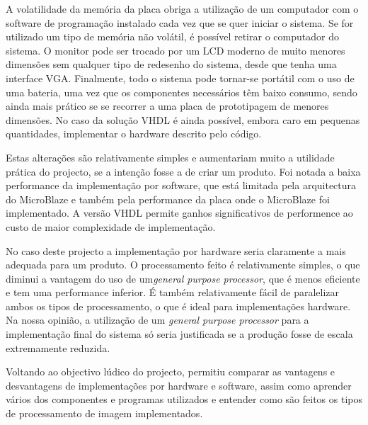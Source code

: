 \documentclass[a4paper,12pt]{article}
\begin{document}
A volatilidade da memória da placa obriga a utilização de um computador com o software de programação instalado cada vez que se quer iniciar o sistema. Se for utilizado um tipo de memória não volátil, é possível retirar o computador do sistema. O monitor pode ser trocado por um LCD moderno de muito menores dimensões sem qualquer tipo de redesenho do sistema, desde que tenha uma interface VGA. Finalmente, todo o sistema pode tornar-se portátil com o uso de uma bateria, uma vez que os componentes necessários têm baixo consumo, sendo ainda mais prático se se recorrer a uma placa de prototipagem de menores dimensões. No caso da solução VHDL é ainda possível, embora caro em pequenas quantidades, implementar o hardware descrito pelo código. 

Estas alterações são relativamente simples e aumentariam muito a utilidade prática do projecto, se a intenção fosse a de criar um produto. 
Foi notada a baixa performance da implementação por software, que está limitada pela arquitectura do MicroBlaze e também pela performance da placa onde o MicroBlaze foi implementado. A versão VHDL permite ganhos significativos de performence ao custo de maior complexidade de implementação.   

No caso deste projecto a implementação por hardware seria claramente a mais adequada para um produto. O processamento feito é relativamente simples, o que diminui a vantagem do uso de um\textit{general purpose processor}, que é menos eficiente e tem uma performance inferior. É também relativamente fácil de paralelizar ambos os tipos de processamento, o que é ideal para implementações hardware. Na nossa opinião, a utilização de um \textit{general purpose processor} para a implementação final do sistema só seria justificada se a produção fosse de escala extremamente reduzida.

Voltando ao objectivo lúdico do projecto, permitiu comparar as vantagens e desvantagens de implementações por hardware e software, assim como aprender vários dos componentes e programas utilizados e entender como são feitos os tipos de processamento de imagem implementados. 



\nocite{labsECom}
\end{document}
